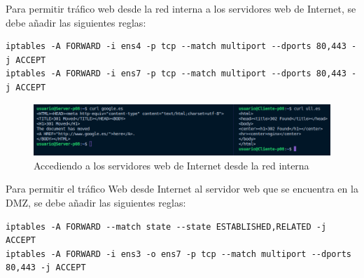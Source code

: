 \documentclass[11pt]{report} %
\begin{document}




\lstset{style=mystyle}


\cleardoublepage

Para permitir tráfico web desde la red interna a los servidores web de Internet, se debe añadir las siguientes reglas:
\begin{verbatim}
iptables -A FORWARD -i ens4 -p tcp --match multiport --dports 80,443 -j ACCEPT
iptables -A FORWARD -i ens7 -p tcp --match multiport --dports 80,443 -j ACCEPT
\end{verbatim}

\begin{figure}[H]
  \centering
  \includegraphics[scale=0.4]{img/web_internet.png}
  \caption{Accediendo a los servidores web de Internet desde la red interna}
  \label{fig:permitir tráfico web desde la red interna a los servidores web de Internet}
\end{figure}

Para permitir el tráfico Web desde Internet al servidor web que se encuentra en la DMZ, se debe añadir las siguientes reglas:
\begin{verbatim}
iptables -A FORWARD --match state --state ESTABLISHED,RELATED -j ACCEPT
iptables -A FORWARD -i ens3 -o ens7 -p tcp --match multiport --dports 80,443 -j ACCEPT
\end{verbatim}
\end{document}
